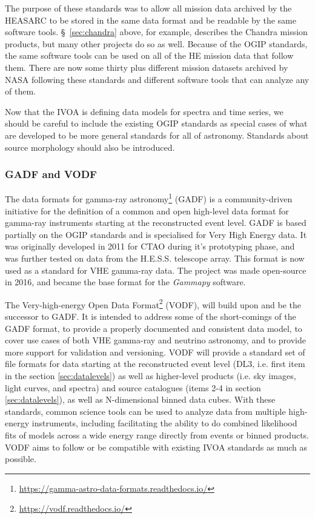 \documentclass[11pt,a4paper]{ivoa}
\begin{document}
The purpose of these standards was to allow all mission data archived by the HEASARC to be stored in the same data format
and be readable by the same software tools. \S~\ref{sec:chandra} above, for example, describes the Chandra mission products,
but many other projects do so as well. Because of the OGIP standards, the same software tools can be used on all of the HE
mission data that follow them. There are now some thirty plus different mission datasets archived by NASA following
these standards and different software tools that can analyze any of them.

Now that the IVOA is defining data models for spectra and time series, we should be careful to include the existing OGIP
standards as special cases of what are developed to be more general standards for all of astronomy. Standards about
source morphology should also be introduced.

\subsubsection{GADF and VODF}
\label{sec:GADF}

The data formats for gamma-ray astronomy\footnote{\url{https://gamma-astro-data-formats.readthedocs.io/}} (GADF) is a community-driven initiative for the definition
of a common and open high-level data format for gamma-ray instruments \citep{2017AIPC.1792g0006D} starting at the
reconstructed event level. GADF is based partially on the OGIP standards and is specialised for Very High Energy data.
It was originally developed in 2011 for CTAO during it's prototyping phase, and was further tested on data from the
H.E.S.S. telescope array. This format is now used as a standard for VHE gamma-ray data. The project was made open-source
in 2016, and became the base format for the \emph{Gammapy} software.

The Very-high-energy Open Data Format\footnote{\url{https://vodf.readthedocs.io/}} (VODF), will build upon and be the successor to GADF. It is
intended to address some of the short-comings of the GADF format, to provide a properly documented and consistent data
model, to cover use cases of both VHE gamma-ray and neutrino astronomy, and to provide more support for validation and
versioning. VODF will provide a standard set of file formats for data starting at the reconstructed event level (DL3, i.e.
first item in the section \ref{sec:datalevels}) as well as higher-level products (i.e. sky images, light curves, and spectra)
and source catalogues (items 2-4 in section \ref{sec:datalevels}), as well as N-dimensional binned data cubes. With these
standards, common science tools can be used to analyze data from multiple high-energy instruments, including
facilitating the ability to do combined likelihood fits of models across a wide energy range directly from events or
binned products. VODF aims to follow or be compatible with existing IVOA standards as much as possible.
\end{document}
